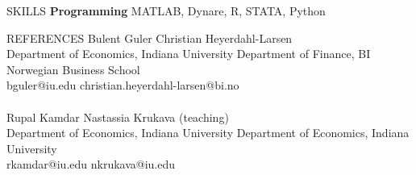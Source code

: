 \documentclass{resume} %
\begin{document}
\begin{rSection}{SKILLS}
\textbf{Programming} MATLAB, Dynare, R, STATA, Python
\end{rSection}

\iffalse
\begin{rSection}{MISCELLANEOUS}
    \begin{itemize}
        \item[]Date of Birth: 1994/10/17 
        \item[]Chinese citizen, F1 Visa holder
    \end{itemize}
\end{rSection}
\fi



\begin{rSection}{REFERENCES}
    Bulent Guler  \hspace{7.5cm} Christian Heyerdahl-Larsen\\
    Department of Economics, Indiana University \hspace{2cm} Department of Finance, BI Norwegian Business School\\
    bguler@iu.edu \hspace{7.35cm} christian.heyerdahl-larsen@bi.no\\
\\
Rupal Kamdar \hspace{7.2cm} Nastassia Krukava (teaching)\\
Department of Economics, Indiana University \hspace{2cm} Department of Economics, Indiana University\\
rkamdar@iu.edu \hspace{7cm} nkrukava@iu.edu 
\end{rSection}
\end{document}
